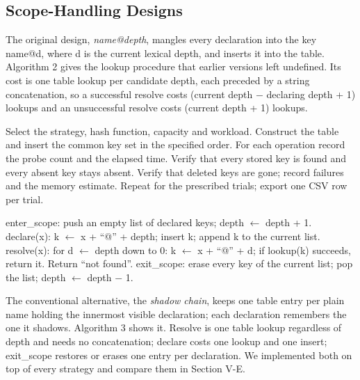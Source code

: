 \documentclass{ieeeaccess}
\begin{document}
\subsection{Scope-Handling Designs}

The original design, \emph{name@depth}, mangles every declaration into the key name@d, where d is the current lexical depth, and inserts it into the table. Algorithm 2 gives the lookup procedure that earlier versions left undefined. Its cost is one table lookup per candidate depth, each preceded by a string concatenation, so a successful resolve costs (current depth $-$ declaring depth + 1) lookups and an unsuccessful resolve costs (current depth + 1) lookups.

\begin{algorithm}[!t]
\caption{Benchmark one strategy}
\begin{algorithmic}[1]
\STATE Select the strategy, hash function, capacity and workload.
\STATE Construct the table and insert the common key set in the specified order.
\STATE For each operation record the probe count and the elapsed time.
\STATE Verify that every stored key is found and every absent key stays absent.
\STATE Verify that deleted keys are gone; record failures and the memory estimate.
\STATE Repeat for the prescribed trials; export one CSV row per trial.
\end{algorithmic}
\end{algorithm}

\begin{algorithm}[!t]
\caption{Block scopes with name@depth keys}
\begin{algorithmic}[1]
\STATE enter\_scope: push an empty list of declared keys; depth $\leftarrow$ depth + 1.
\STATE declare(x): k $\leftarrow$ x + ``@'' + depth; insert k; append k to the current list.
\STATE resolve(x): for d $\leftarrow$ depth down to 0: k $\leftarrow$ x + ``@'' + d; if lookup(k) succeeds, return it. Return ``not found''.
\STATE exit\_scope: erase every key of the current list; pop the list; depth $\leftarrow$ depth $-$ 1.
\end{algorithmic}
\end{algorithm}

The conventional alternative, the \emph{shadow chain}, keeps one table entry per plain name holding the innermost visible declaration; each declaration remembers the one it shadows. Algorithm 3 shows it. Resolve is one table lookup regardless of depth and needs no concatenation; declare costs one lookup and one insert; exit\_scope restores or erases one entry per declaration. We implemented both on top of every strategy and compare them in Section V-E.
\end{document}
